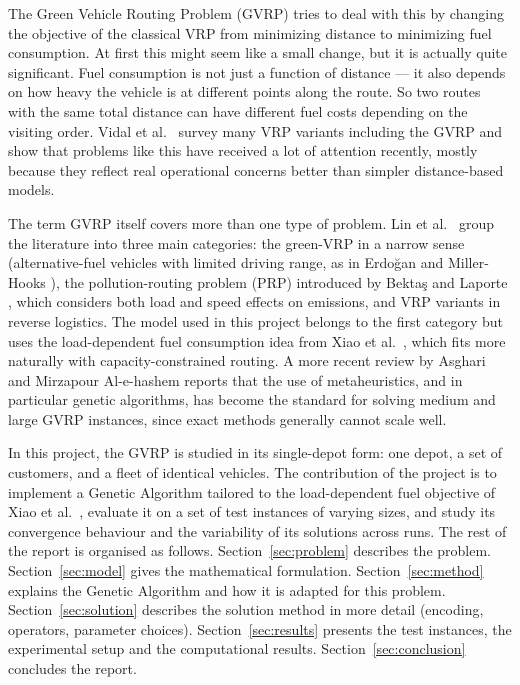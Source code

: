 \documentclass [a4paper, 11pt, titlepage] {article}
\begin{document}
The Green Vehicle Routing Problem (GVRP) tries to deal with this by changing the objective of the classical VRP from minimizing distance to minimizing fuel consumption. At first this might seem like a small change, but it is actually quite significant. Fuel consumption is not just a function of distance --- it also depends on how heavy the vehicle is at different points along the route. So two routes with the same total distance can have different fuel costs depending on the visiting order. Vidal et al.\ \cite{vidal2020} survey many VRP variants including the GVRP and show that problems like this have received a lot of attention recently, mostly because they reflect real operational concerns better than simpler distance-based models.

The term GVRP itself covers more than one type of problem. Lin et al.\ \cite{lin2014} group the literature into three main categories: the green-VRP in a narrow sense (alternative-fuel vehicles with limited driving range, as in Erdoğan and Miller-Hooks \cite{erdogan2012}), the pollution-routing problem (PRP) introduced by Bektaş and Laporte \cite{bektas2011}, which considers both load and speed effects on emissions, and VRP variants in reverse logistics. The model used in this project belongs to the first category but uses the load-dependent fuel consumption idea from Xiao et al.\ \cite{xiao2012}, which fits more naturally with capacity-constrained routing. A more recent review by Asghari and Mirzapour Al-e-hashem \cite{asghari2021} reports that the use of metaheuristics, and in particular genetic algorithms, has become the standard for solving medium and large GVRP instances, since exact methods generally cannot scale well.

In this project, the GVRP is studied in its single-depot form: one depot, a set of customers, and a fleet of identical vehicles. The contribution of the project is to implement a Genetic Algorithm tailored to the load-dependent fuel objective of Xiao et al.\ \cite{xiao2012}, evaluate it on a set of test instances of varying sizes, and study its convergence behaviour and the variability of its solutions across runs. The rest of the report is organised as follows. Section~\ref{sec:problem} describes the problem. Section~\ref{sec:model} gives the mathematical formulation. Section~\ref{sec:method} explains the Genetic Algorithm and how it is adapted for this problem. Section~\ref{sec:solution} describes the solution method in more detail (encoding, operators, parameter choices). Section~\ref{sec:results} presents the test instances, the experimental setup and the computational results. Section~\ref{sec:conclusion} concludes the report.
\end{document}
